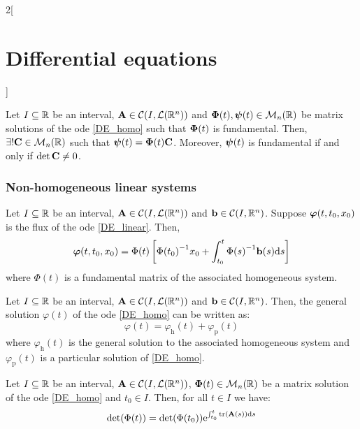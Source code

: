 \documentclass[../../../main.tex]{subfiles}
\begin{document}
\begin{multicols}{2}[\section{Differential equations}]
\begin{prop}
\begin{enumerate}
    \end{enumerate}
  \end{prop}
  \begin{prop}
    Let $I\subseteq \mathbb{R}$ be an interval, $\boldsymbol{\mathrm{A}}\in\mathcal{C}(I,\mathcal{L}(\mathbb{R}^n))$ and $\boldsymbol{\mathrm{\Phi}}(t),\boldsymbol{\mathrm{\psi}}(t)\in\mathcal{M}_n(\mathbb{R})$ be matrix solutions of the ode \eqref{DE_homo} such that $\boldsymbol{\mathrm{\Phi}}(t)$ is fundamental. Then, $\exists! \boldsymbol{\mathrm{C}}\in\mathcal{M}_n(\mathbb{R})$ such that $\boldsymbol{\mathrm{\psi}}(t)=\boldsymbol{\mathrm{\Phi}}(t)\boldsymbol{\mathrm{C}}$. Moreover, $\boldsymbol{\mathrm{\psi}}(t)$ is fundamental if and only if $\det \boldsymbol{\mathrm{C}}\ne 0$.
  \end{prop}
  \subsubsection{Non-homogeneous linear systems}
  \begin{prop}
    Let $I\subseteq \mathbb{R}$ be an interval, $\boldsymbol{\mathrm{A}}\in\mathcal{C}(I,\mathcal{L}(\mathbb{R}^n))$ and $\boldsymbol{\mathrm{b}}\in\mathcal{C}(I,\mathbb{R}^n)$. Suppose $\boldsymbol{\mathrm{\varphi}}(t,t_0,x_0)$ is the flux of the ode \eqref{DE_linear}. Then, $$\boldsymbol{\mathrm{\varphi}}(t,t_0,x_0)=\Phi(t)\left[{\Phi(t_0)}^{-1}x_0+\int_{t_0}^t{\Phi(s)}^{-1}\boldsymbol{\mathrm{b}}(s)\dd s\right]$$ where $\Phi(t)$ is a fundamental matrix of the associated homogeneous system.
  \end{prop}
  \begin{corollary}
    Let $I\subseteq \mathbb{R}$ be an interval, $\boldsymbol{\mathrm{A}}\in\mathcal{C}(I,\mathcal{L}(\mathbb{R}^n))$ and $\boldsymbol{\mathrm{b}}\in\mathcal{C}(I,\mathbb{R}^n)$. Then, the general solution $\varphi(t)$ of the ode \eqref{DE_homo} can be written as: $$\varphi(t)=\varphi_\mathrm{h}(t)+\varphi_\mathrm{p}(t)$$ where $\varphi_\mathrm{h}(t)$ is the general solution to the associated homogeneous system and $\varphi_\mathrm{p}(t)$ is a particular solution of \eqref{DE_homo}.
  \end{corollary}
  \begin{prop}
    Let $I\subseteq \mathbb{R}$ be an interval, $\boldsymbol{\mathrm{A}}\in\mathcal{C}(I,\mathcal{L}(\mathbb{R}^n))$, $\boldsymbol{\mathrm{\Phi}}(t)\in\mathcal{M}_n(\mathbb{R})$ be a matrix solution of the ode \eqref{DE_homo} and $t_0\in I$. Then, for all $t\in I$ we have: $$\det(\Phi(t))=\det (\Phi(t_0))\exp{\int_{t_0}^t\trace(\vectorfunction{A}(s))\dd s}$$
  \end{prop}

\end{multicols}
\end{document}
